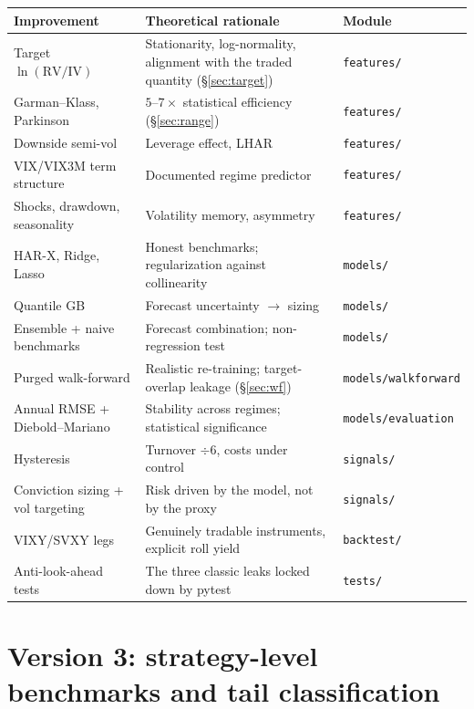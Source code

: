 \documentclass[11pt,a4paper]{article}
\newcommand{\RV}{\mathrm{RV}}
\newcommand{\IV}{\mathrm{IV}}
\begin{document}
\begin{center}
\small
\begin{tabular}{p{4.2cm} p{6.2cm} p{3.8cm}}
\toprule
\textbf{Improvement} & \textbf{Theoretical rationale} & \textbf{Module} \\
\midrule
Target $\ln(\RV/\IV)$ & Stationarity, log-normality, alignment with the traded quantity (\S\ref{sec:target}) & \texttt{features/} \\
Garman--Klass, Parkinson & $5$--$7\times$ statistical efficiency (\S\ref{sec:range}) & \texttt{features/} \\
Downside semi-vol & Leverage effect, LHAR & \texttt{features/} \\
VIX/VIX3M term structure & Documented regime predictor & \texttt{features/} \\
Shocks, drawdown, seasonality & Volatility memory, asymmetry & \texttt{features/} \\
HAR-X, Ridge, Lasso & Honest benchmarks; regularization against collinearity & \texttt{models/} \\
Quantile GB & Forecast uncertainty $\to$ sizing & \texttt{models/} \\
Ensemble + naive benchmarks & Forecast combination; non-regression test & \texttt{models/} \\
Purged walk-forward & Realistic re-training; target-overlap leakage (\S\ref{sec:wf}) & \texttt{models/walkforward} \\
Annual RMSE + Diebold--Mariano & Stability across regimes; statistical significance & \texttt{models/evaluation} \\
Hysteresis & Turnover $\div 6$, costs under control & \texttt{signals/} \\
Conviction sizing + vol targeting & Risk driven by the model, not by the proxy & \texttt{signals/} \\
VIXY/SVXY legs & Genuinely tradable instruments, explicit roll yield & \texttt{backtest/} \\
Anti-look-ahead tests & The three classic leaks locked down by pytest & \texttt{tests/} \\
\bottomrule
\end{tabular}
\end{center}

\section{Version 3: strategy-level benchmarks and tail classification}
\label{sec:v3}
\end{document}
